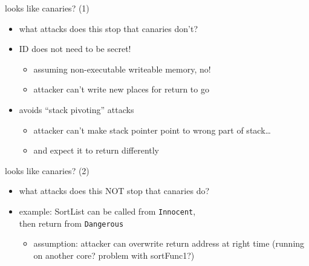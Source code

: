 \begin{frame}{looks like canaries? (1)}
    \begin{itemize}
    \item what attacks does this stop that canaries don't?
    \vspace{.5cm}
    \item<2-> ID does not need to be secret!
        \begin{itemize}
        \item<2-> assuming non-executable writeable memory, no!
        \item<2-> attacker can't write new places for return to go
        \end{itemize}
    \item<3-> avoids ``stack pivoting'' attacks
        \begin{itemize}
        \item attacker can't make stack pointer point to wrong part of stack\ldots
        \item and expect it to return differently
        \end{itemize}
    \end{itemize}
\end{frame}

\begin{frame}[fragile,label=cfiLikeCanariesP2]{looks like canaries? (2)}
    \begin{itemize}
    \item what attacks does this NOT stop that canaries do?
    \item example: SortList can be called from \texttt{Innocent}, \\ then return from \texttt{Dangerous}
        \begin{itemize}
        \item assumption: attacker can overwrite return address at right time (running on another core? problem with sortFunc1?)
        \end{itemize}
    \end{itemize}
\end{frame}
